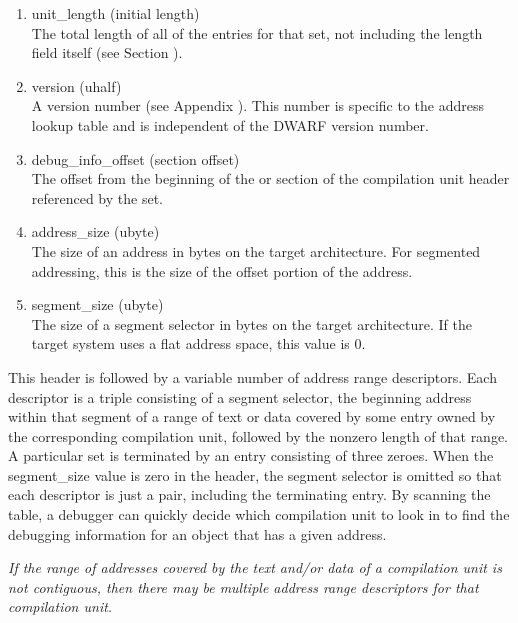 \begin{enumerate}[1.]

\item unit\_length (initial length) \\
The total length of all of the
entries for that set, not including the length field itself
(see Section ).

\item version (uhalf) \\
A version number 
(see Appendix ). 
This
number is specific to the address lookup table and is
independent of the DWARF version number.

\item debug\_info\_offset (section offset) \\
The offset from the
beginning of the  or 
 section of the
compilation unit header referenced by the set.

\item address\_size (ubyte) \\
The size of an address in bytes on
the target architecture. For 
segmented addressing, this is
the size of the offset portion of the address.

\item segment\_size (ubyte) \\
The size of a segment selector in
bytes on the target architecture. If the target system uses
a flat address space, this value is 0.

\end{enumerate}


This header is followed by a variable number of address range
descriptors. Each descriptor is a triple consisting of a
segment selector, the beginning address within that segment
of a range of text or data covered by some entry owned by
the corresponding compilation unit, followed by the non\dash zero
length of that range. A particular set is terminated by an
entry consisting of three zeroes. When the segment\_size value
is zero in the header, the segment selector is omitted so that
each descriptor is just a pair, including the terminating
entry. By scanning the table, a debugger can quickly decide
which compilation unit to look in to find the debugging
information for an object that has a given address.

\textit{If the range of addresses covered by the text and/or data
of a compilation unit is not contiguous, then there may be
multiple address range descriptors for that compilation unit.}




